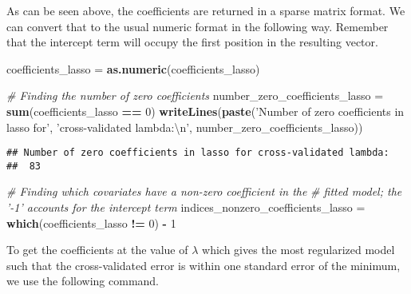 \documentclass[
]{book}
\newenvironment{Shaded}{\begin{snugshade}}{\end{snugshade}}
\newcommand{\CharTok}[1]{\textcolor[rgb]{0.31,0.60,0.02}{#1}}
\newcommand{\CommentTok}[1]{\textcolor[rgb]{0.56,0.35,0.01}{\textit{#1}}}
\newcommand{\DecValTok}[1]{\textcolor[rgb]{0.00,0.00,0.81}{#1}}
\newcommand{\KeywordTok}[1]{\textcolor[rgb]{0.13,0.29,0.53}{\textbf{#1}}}
\newcommand{\NormalTok}[1]{#1}
\newcommand{\OperatorTok}[1]{\textcolor[rgb]{0.81,0.36,0.00}{\textbf{#1}}}
\newcommand{\StringTok}[1]{\textcolor[rgb]{0.31,0.60,0.02}{#1}}
\begin{document}
As can be seen above, the coefficients are returned in a sparse matrix format. We can convert that to the usual numeric format in the following way. Remember that the intercept term will occupy the first position in the resulting vector.

\begin{Shaded}
\begin{Highlighting}[]
\NormalTok{coefficients_lasso =}\StringTok{ }\KeywordTok{as.numeric}\NormalTok{(coefficients_lasso)}

\CommentTok{# Finding the number of zero coefficients}
\NormalTok{number_zero_coefficients_lasso =}\StringTok{ }\KeywordTok{sum}\NormalTok{(coefficients_lasso }\OperatorTok{==}\StringTok{ }\DecValTok{0}\NormalTok{)}
\KeywordTok{writeLines}\NormalTok{(}\KeywordTok{paste}\NormalTok{(}\StringTok{'Number of zero coefficients in lasso for'}\NormalTok{,}
                 \StringTok{'cross-validated lambda:}\CharTok{\textbackslash{}n}\StringTok{'}\NormalTok{,}
\NormalTok{                 number_zero_coefficients_lasso))}
\end{Highlighting}
\end{Shaded}

\begin{verbatim}
## Number of zero coefficients in lasso for cross-validated lambda:
##  83
\end{verbatim}

\begin{Shaded}
\begin{Highlighting}[]
\CommentTok{# Finding which covariates have a non-zero coefficient in the}
\CommentTok{# fitted model; the '-1' accounts for the intercept term}
\NormalTok{indices_nonzero_coefficients_lasso =}
\StringTok{  }\KeywordTok{which}\NormalTok{(coefficients_lasso }\OperatorTok{!=}\StringTok{ }\DecValTok{0}\NormalTok{) }\OperatorTok{-}\StringTok{ }\DecValTok{1}
\end{Highlighting}
\end{Shaded}

To get the coefficients at the value of \(\lambda\) which gives the most regularized model such that the cross-validated error is within one standard error of the minimum, we use the following command.
\end{document}
